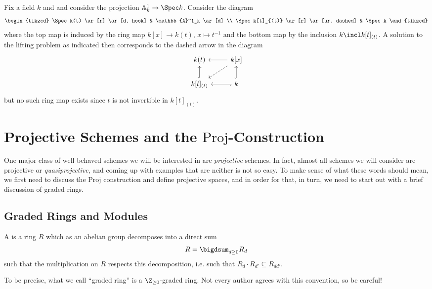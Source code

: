 \documentclass[wip, algebra]{bsteffan-lecturenotes}
\newcommand{\A}{\mathbb{A}}
\newcommand{\Proj}{\mathrm{Proj}}
\begin{document}
\begin{example}
	Fix a field $k$ and and consider the projection $\A^1_k \to \Spec k$.
	Consider the diagram
	\begin{equation*}
		\begin{tikzcd}
			\Spec k(t)
					\ar[r]
					\ar[d, hook]
				& \A^1_k
					\ar[d]
			\\
			\Spec k[t]_{(t)}
					\ar[r]
					\ar[ur, dashed]
				& \Spec k
		\end{tikzcd}
	\end{equation*}
	where the top map is induced by the ring map $k[x] \to k(t)$, $x \mapsto t^{-1}$ and the bottom map by the inclusion $k \incl k[t]_{(t)}$.
	A solution to the lifting problem as indicated then corresponds to the dashed arrow in the diagram
	\begin{equation*}
		\begin{tikzcd}
			k(t)
				& k[x]
					\ar[l]
					\ar[dl, dashed]
			\\
			k[t]_{(t)}
					\ar[u, hook]
				& k
					\ar[l, hook]
					\ar[u, hook]
		\end{tikzcd}
	\end{equation*}
	but no such ring map exists since $t$ is not invertible in $k[t]_{(t)}$.
\end{example}

\section{Projective Schemes and the \texorpdfstring{$\Proj$}{Proj}-Construction}
One major class of well-behaved schemes we will be interested in are \emph{projective} schemes.
In fact, almost all schemes we will consider are projective or \emph{quasiprojective}, and coming up with examples that are neither is not so easy.
To make sense of what these words should mean, we first need to discuss the $\Proj$ construction and define projective spaces, and in order for that, in turn, we need to start out with a brief discussion of graded rings.

\subsection{Graded Rings and Modules}
\begin{definition}
	A  is a ring $R$ which as an abelian group decomposes into a direct sum
	\begin{equation*}
		R = \bigdsum_{d \geq 0} R_d
	\end{equation*}
	such that the multiplication on $R$ respects this decomposition, i.e. such that $R_d \cdot R_{d'} \subseteq R_{dd'}$.
\end{definition}
To be precise, what we call \enquote{graded ring} is a $\Z_{\geq 0}$-graded ring.
Not every author agrees with this convention, so be careful!
\end{document}
